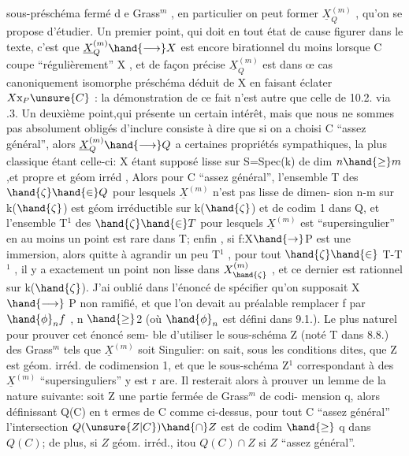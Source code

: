 
sous-préschéma fermé d e Grass$^{m}$ , en particulier on peut former $\underline{X}^{(m)}_{Q}$ ,
qu'on se propose d'étudier. Un premier point, qui doit en tout état de
cause figurer dans le texte, c'est que $\underline{X}^{(m)}_{Q} \hand{\longrightarrow} X$ est encore birationnel
du moins lorsque C coupe ``régulièrement'' X , et de façon précise $\underline{X}^{(m)}_{Q}$
est dans œ cas canoniquement isomorphe  préschéma déduit de X en
faisant éclater $X\mathrm{x}_{P}\unsure{C}$ : la démonstration de ce fait n'est autre que celle
de 10.2. via .3. Un deuxième point,qui présente un certain intérêt,
mais que nous ne sommes pas absolument obligés d'inclure consiste à
dire que si on a choisi C ``assez général'', alors $\underline{X}^{(m)}_{Q} \hand{\longrightarrow} Q$ a certaines
propriétés sympathiques, la plus classique étant celle-ci: X étant
supposé lisse sur S=Spec(k) de dim $n \hand{\geq} m$,et propre et géom irréd , Alors pour C ``assez
général'', l'ensemble T des $\hand{\zeta}\hand{\in} Q$ pour lesquels $\underline{X}^{(m)}$ n'est pas lisse de dimen-%
sion n-m sur k($\hand{\zeta}$) est géom irréductible sur k($\hand{\zeta}$) et de codim 1 dans Q, et 
l'ensemble T$^{1}$ des $\hand{\zeta}\hand{\in} T$ pour lesquels $\underline{X}^{(m)}$ est ``supersingulier'' en au
moins un point est rare dans T;
 enfin , si f:X$\hand{\rightarrow}$P est une immersion, alors
quitte à agrandir un peu T$^{1}$ , pour tout $\hand{\zeta}\hand{\in}$ T-T$^{1}$ , il y a exactement un
\placedmargin{$|$}point non lisse dans $X^{(m)}_{\hand{\zeta}}$ , et ce dernier est rationnel sur k($\hand{\zeta}$). J'ai
oublié dans l'énoncé de spécifier qu'on supposait X  $\hand{\longrightarrow}$ P non ramifié,
et que l'on devait au préalable remplacer f par $\hand{\phi}_{n}f$ , n $\hand{\geq}$2 (où $\hand{\phi}_{n}$ est
défini dans 9.1.). Le plus naturel  pour prouver cet énoncé sem-%
ble d'utiliser le sous-schéma Z (noté T dans 8.8.) des Grass$^{m}$ tels
que $\underline{X}^{(m)}$ soit Singulier: on sait, sous les conditions dites, que Z
est géom. irréd. de codimension 1, et que le sous-schéma Z$^{1}$ correspondant
à des $\underline{X}^{(m)}$ ``supersinguliers'' y est r are. Il resterait alors à prouver un
lemme de la nature suivante: soit Z une partie fermée de Grass$^{m}$ de codi-%
mension q, alors définissant Q(C) en t ermes de C comme ci-dessus, pour
tout C ``assez général'' l'intersection $Q(\unsure{Z|C})\hand{\cap} Z$ est de codim $\hand{\geq}$ q dans
$Q(C)$; de plus, si $Z$ géom. irréd., itou $Q(C)\cap Z$ si $Z$ ``assez général''.

